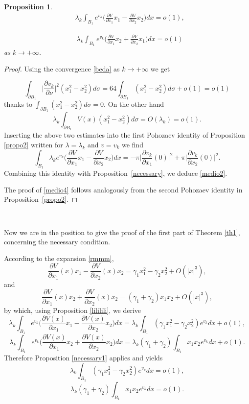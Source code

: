 \documentclass[reqno,11pt]{amsart}
\newtheorem{prop}[thm]{Proposition}
\theoremstyle{definition}
\numberwithin{equation}{section}
\newcommand{\la}{\lambda}
\renewcommand{\(}{\left(}
\renewcommand{\)}{\right)}
\renewcommand{\[}{\left[}
\renewcommand{\]}{\right]}
\newcommand{\beq}{\begin{equation}}
\newcommand{\eeq}{\end{equation}}
\begin{document}
{\begin{prop}
 \beq\label{medio2}\begin{aligned}& \la_k\int_{B_1} e^{v_k}\bigg(\frac{\partial V}{\partial x_1}x_1-\frac{\partial V}{\partial x_2}x_2\bigg) dx  
=o(1),\end{aligned}\eeq

\beq\label{medio4}\begin{aligned}& \la_k\int_{B_1} e^{v_k}\bigg(\frac{\partial V}{\partial x_1}x_2+\frac{\partial V}{\partial x_2}x_1\bigg) dx  
=o(1) \end{aligned}\eeq as $k\to +\infty$.


\end{prop}

\begin{proof} 
Using the convergence \eqref{beda} as $k\to +\infty$ we get 

$$\int_{\partial B_1}\bigg|\frac{\partial v_k}{\partial \nu}\bigg|^2 (x_1^2-x_2^2) d\sigma=64\int_{\partial B_1} (x_1^2-x_2^2) d\sigma+o(1)=o(1)$$
thanks to $\int_{\partial B_1}(x_1^2-x_2^2)d\sigma=0$. On the other hand  $$\la_k\int_{\partial B_1}V(x)(x_1^2-x_2^2)d\sigma=O(\la_k)=o(1).$$  Inserting  the above two  estimates into the first Pohozaev identity of  Proposition \ref{propo2} written for $\la=\la_k$ and $v=v_k$ we find $$\int_{B_1} \la_k e^{v_k}\bigg(\frac{\partial V}{\partial x_1}x_1-\frac{\partial V}{\partial x_2}x_2\bigg) dx  =-\pi\bigg|\frac{\partial v_k}{\partial x_1}(0)\bigg|^2+\pi\bigg|\frac{\partial v_k}{\partial x_2}(0)\bigg|^2 .$$ Combining this identity with Proposition~\ref{necessary}, we deduce
\eqref{medio2}.

The proof of \eqref{medio4} follows analogously from the second Pohozaev
identity in Proposition~\ref{propo2}.

\end{proof}

\
 

Now we are in the position to give the proof of the first part of Theorem \ref{th1}, concerning the necessary condition. 

 
According to the expansion \eqref{rmmm},  $$\frac{\partial V}{\partial x_1}(x)x_1-\frac{\partial V}{\partial x_2}(x)x_2= \gamma_1 x_1^2-\gamma_2 x_2^2 +O(|x|^3),$$ and
 $$\frac{\partial V}{\partial x_1}(x)x_2+\frac{\partial V}{\partial x_2}(x)x_2= (\gamma_1+\gamma_2  )x_1x_2 +O(|x|^3),$$
by which, using Proposition \ref{lililili},  we derive 
$$  \la_k\int_{B_1} e^{v_k}\bigg(\frac{\partial V(x)}{\partial x_1}x_1-\frac{\partial V(x)}{\partial x_2}x_2\bigg) dx=\la_k\int_{B_1}(\gamma_1 x_1^2-\gamma_2 x_2^2) e^{v_k}dx+o(1),$$
$$  \la_k\int_{B_1} e^{v_k}\bigg(\frac{\partial V(x)}{\partial x_1}x_2+\frac{\partial V(x)}{\partial x_2}x_2\bigg) dx=\la_k(\gamma_1+\gamma_2 )\int_{B_1}x_1x_2e^{v_k}dx+o(1).$$
Therefore Proposition \ref{necessary1} applies and yields\beq\label{exx}\la_k\int_{B_1}(\gamma_1 x_1^2-\gamma_2 x_2^2) e^{v_k}dx=o(1),\eeq
 \beq\label{exx1}\la_k(\gamma_1+\gamma_2 )\int_{B_1}x_1x_2e^{v_k}dx =o(1).\eeq




}
\end{document}
